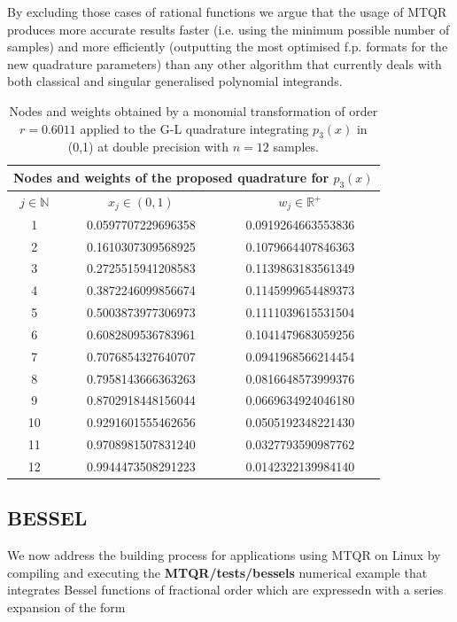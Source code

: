 \documentclass[a4paper, twosided]{book}
\begin{document}
\noindent
 By excluding those cases of rational functions we argue that the usage of MTQR produces more accurate results faster (i.e. using the minimum possible number of samples) and more efficiently (outputting the most optimised f.p. formats for the new quadrature parameters) than any other algorithm that currently deals with both classical and singular generalised polynomial integrands.

\begin{table}[H]
\centering
\begin{tabular}{|c||c|c|}
\hline
\multicolumn{3}{|c|}{\textbf{Nodes and weights of the proposed quadrature for $p_3(x)$}} \\
\hline
$j\in\mathbb{N}$ & $x_j\in(0,1)$ & $w_j\in\mathbb{R}^+$ \\
\hline
1   &  0.0597707229696358   &  0.0919264663553836  \\
2   &  0.1610307309568925   &  0.1079664407846363  \\
3   &  0.2725515941208583   &  0.1139863183561349  \\
4   &  0.3872246099856674   &  0.1145999654489373  \\
5   &  0.5003873977306973   &  0.1111039615531504  \\
6   &  0.6082809536783961   &  0.1041479683059256  \\
7   &  0.7076854327640707   &  0.0941968566214454  \\
8   &  0.7958143666363263   &  0.0816648573999376  \\
9   &  0.8702918448156044   &  0.0669634924046180  \\
10  &  0.9291601555462656   &  0.0505192348221430  \\
11  &  0.9708981507831240   &  0.0327793590987762  \\
12  &  0.9944473508291223   &  0.0142322139984140  \\
\hline
\end{tabular}
  \caption{Nodes and weights obtained by a monomial transformation of order $r=0.6011$ applied to the G-L quadrature integrating $p_3(x)$ in (0,1) at double precision with $n=12$ samples.}
  \label{table2.4}
\end{table}

\subsection[Bessel]{\changefont BESSEL}\label{SubSec2.4.2}
We now address the building process for applications using MTQR on Linux by compiling and executing the \colorbox{poliGrayBlue}{\textbf{MTQR/tests/bessels}} numerical example that integrates Bessel functions of fractional order \cite{Abramowitz} which are expressedn with a series expansion of the form
\end{document}
